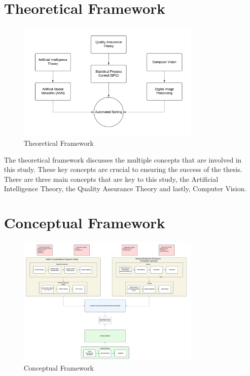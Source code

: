 

\section{Theoretical Framework}

\begin{figure}[!htbp]
	\centering
		\includegraphics[width=0.8\textwidth]{figure/theoretical_framework.png}
	\caption{Theoretical Framework}
	\label{fig:theoretical_framework}
\end{figure}

The theoretical framework discusses the multiple concepts that are involved in this study. These key concepts are crucial to ensuring the success of the thesis. There are three main concepts that are key to this study, the Artificial Intelligence Theory, the Quality Assurance Theory and lastly, Computer Vision.

\section{Conceptual Framework}

\begin{figure}[!htbp]
	\centering
		\includegraphics[width=0.8\textwidth]{figure/conceptual_framework.png}
	\caption{Conceptual Framework}
	\label{fig:conceptual_framework}
\end{figure}

